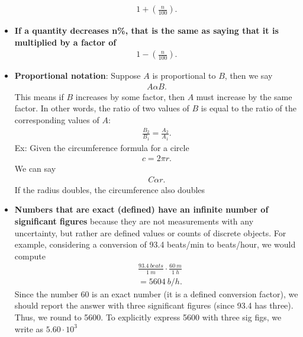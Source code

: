 \documentclass{report}
\begin{document}
\begin{itemize}
            \begin{align*}
                1 + \left(\frac{n}{100}\right)
            .\end{align*}
        \item \textbf{If a quantity decreases n\%, that is the same as saying that it is multiplied by a factor of}
            \begin{align*}
                1 - \left(\frac{n}{100}\right)
            .\end{align*}
        \item \textbf{Proportional notation}: Suppose $A$ is proportional to $B$, then we say
            \begin{align*}
               A \alpha B 
            .\end{align*}
            This means if $B$ increases by some factor, then $A$ must increase by the same factor.
            \bigbreak \noindent 
            In other words, the ratio of two values of $B$ is equal to the ratio of the corresponding values of $A$:
            \begin{align*}
                \frac{B_{2}}{B_{1}} = \frac{A_{2}}{A_{1}}
            .\end{align*}
            \bigbreak \noindent 
            Ex: Given the circumference formula for a circle
            \begin{align*}
               c =2\pi r
            .\end{align*}
            We can say
            \begin{align*}
                C \alpha r
            .\end{align*}
            If the radius doubles, the circumference also doubles
        \item \textbf{Numbers that are exact (defined) have an infinite number of significant figures} because they are not measurements with any uncertainty, but rather are defined values or counts of discrete objects. For example, considering a conversion of 93.4 beats/min to beats/hour, we would compute
            \begin{align*}
            &\frac{93.4\ beats}{1\ m} \cdot \frac{60\ m}{1\ h} \\
            &=5604\ b/h
            .\end{align*}
            Since the number 60 is an exact number (it is a defined conversion factor), we should report the answer with three significant figures (since 93.4 has three). Thus, we round to 5600. To explicitly express 5600 with three sig figs, we write as $5.60 \cdot 10^{3} $

\end{itemize}
\end{document}
